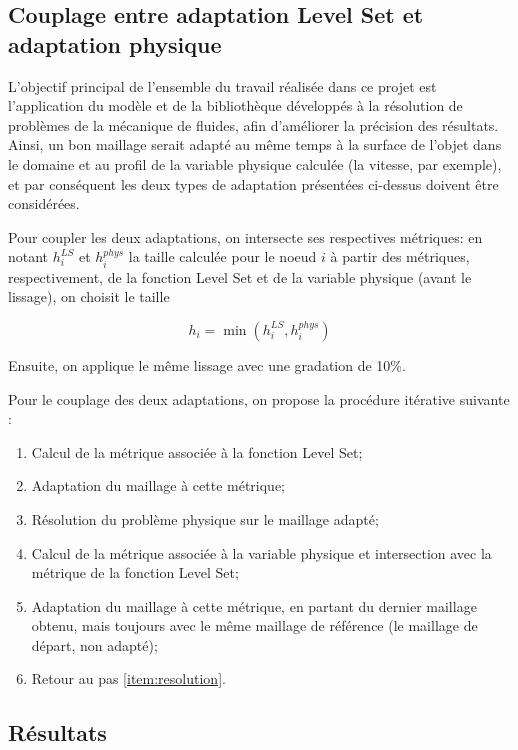 \subsection{Couplage entre adaptation Level Set et adaptation physique}

\indent L'objectif principal de l'ensemble du travail réalisée dans ce projet est l'application du modèle et de la bibliothèque développés à la résolution de problèmes de la mécanique de fluides, afin d'améliorer la précision des résultats. Ainsi, un bon maillage serait adapté au même temps à la surface de l'objet dans le domaine et au profil de la variable physique calculée (la vitesse, par exemple), et par conséquent les deux types de adaptation présentées ci-dessus doivent être considérées.

\indent Pour coupler les deux adaptations, on intersecte ses respectives métriques: en notant \(h_i^{LS}\) et \(h_i^{phys}\) la taille calculée pour le noeud \(i\) à partir des métriques, respectivement, de la fonction Level Set et de la variable physique (avant le lissage), on choisit le taille

\begin{equation*}
	h_i = \min(h_i^{LS},h_i^{phys})
\end{equation*}

\indent Ensuite, on applique le même lissage avec une gradation de 10\%.

\indent Pour le couplage des deux adaptations, on propose la procédure itérative suivante :  

\begin{enumerate}
	\item Calcul de la métrique associée à la fonction Level Set;
	\item Adaptation du maillage à cette métrique;
	\item \label{item:resolution} Résolution du problème physique sur le maillage adapté;
	\item Calcul de la métrique associée à la variable physique et intersection avec la métrique de la fonction Level Set;
	\item Adaptation du maillage à cette métrique, en partant du dernier maillage obtenu, mais toujours avec le même maillage de référence (le maillage de départ, non adapté);
	\item Retour au pas \ref{item:resolution}.
\end{enumerate}

\subsection{Résultats}

